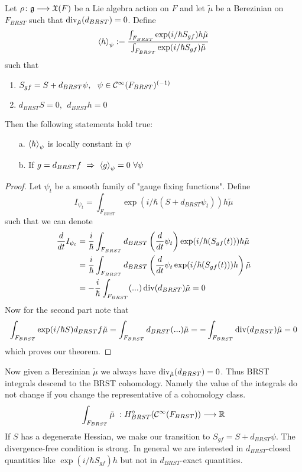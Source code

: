 \begin{theo}[BRST]
  Let $\rho \colon \mathfrak{g} \longrightarrow \mathfrak{X}(F)$ be a Lie algebra action on $F$ and let $\tilde{\mu}$ be a Berezinian on $F_{BRST}$ such that $\operatorname{div}_{\tilde{\mu}}(d_{BRST}) = 0$. Define
  $$ \left\langle h \right\rangle_\psi := \frac{\int_{F_{BRST}} \exp(i/\hbar S_{gf})h \tilde{\mu}}{\int_{F_{BRST}} \exp(i/\hbar S_{gf})\tilde{\mu}} $$
  such that
  \begin{enumerate}
    \item $S_{gf} = S + d_{BRST} \psi, \ \ \psi \in \mathcal{C}^{\infty}(F_{BRST})^{(-1)}$
    \item $d_{BRST} S = 0, \ \ d_{BRST} h = 0$
  \end{enumerate}
  Then the following statements hold true:
  \begin{itemize}
    \item[a.] $\left\langle h \right\rangle_\psi$ is locally constant in $\psi$
    \item[b.] If $g = d_{BRST} f \ \Rightarrow \ \left\langle g \right\rangle_\psi = 0 \ \forall \psi$
  \end{itemize}
\begin{proof}
  Let $\psi_t$ be a smooth family of "gauge fixing functions". Define
  \begin{equation}
    I_{\psi_t} = \int_{F_{BRST}} \exp(i/\hbar (S+ d_{BRST} \psi_t)) h \tilde{\mu}
  \end{equation}
  such that we can denote
  \begin{align}
    \frac{d }{d t} I_{\psi_t} &= \frac{i}{\hbar} \int_{F_{BRST}} d_{BRST}\left(\frac{d }{d t}\psi_t\right) \exp(i/\hbar (S_{gf}(t))) h \tilde{\mu} \\
    &= \frac{i}{\hbar} \int_{F_{BRST}} d_{BRST} \left( \frac{d }{d t}\psi_t \exp(i/\hbar (S_{gf}(t))) h \right) \tilde{\mu} \\
    &= - \frac{i}{\hbar} \int_{F_{BRST}} (...) \operatorname{div}(d_{BRST}) \tilde{\mu} = 0
  \end{align}
  Now for the second part note that
  \begin{align}
    \int_{F_{BRST}} \exp(i/\hbar S) d_{BRST} f \tilde{\mu} = \int_{F_{BRST}} d_{BRST} (...) \tilde{\mu} = - \int_{F_{BRST}} \operatorname{div}(d_{BRST}) \tilde{\mu} = 0
  \end{align}
  which proves our theorem.
\end{proof}
\end{theo}

Now given a Berezinian $\tilde{\mu}$ we always have $\operatorname{div}_{\tilde{\mu}}(d_{BRST}) = 0$. Thus BRST integrals descend to the BRST cohomology. Namely the value of the integrals do not change if you change the representative of a cohomology class.
\begin{equation}
  \int_{F_{BRST}} \tilde{\mu} \ : H^\circ_{BRST} (\mathcal{C}^{\infty}(F_{BRST})) \longrightarrow \mathbb{R}
\end{equation}
If $S$ has a degenerate Hessian, we make our transition to $S_{gf} = S + d_{BRST} \psi$. The divergence-free condition is strong. In general we are interested in $d_{BRST}$-closed quantities like $\exp(i/ \hbar S_{gf}) h$ but not in $d_{BRST}$-exact quantities.\\

